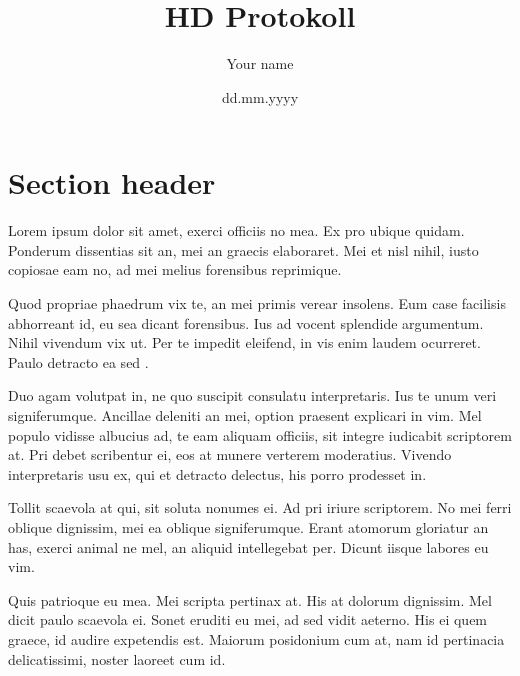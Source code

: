 \documentclass[%
 12pt,     %
 english,  %
 a4paper,  %
 DIV14,    %
 twoside,  %
 thesis,  %
 impberklaerung, %
]{hdprotokoll}
\title{HD Protokoll}
\author{Your name}
\date{dd.mm.yyyy}
\institute{free text}
\begin{document}
\maketitle
\cleardoublepage

\tableofcontents
               

\cleardoublepage 
{}


\section{Section header}
Lorem ipsum dolor sit amet, exerci officiis no mea. Ex pro ubique quidam. Ponderum dissentias sit an, mei an graecis elaboraret. Mei et nisl nihil, iusto copiosae eam no, ad mei melius forensibus reprimique.

Quod propriae phaedrum vix te, an mei primis verear insolens. Eum case facilisis abhorreant id, eu sea dicant forensibus. Ius ad vocent splendide argumentum. Nihil vivendum vix ut. Per te impedit eleifend, in vis enim laudem ocurreret. Paulo detracto ea sed \cite{hector1999plant}.

Duo agam volutpat in, ne quo suscipit consulatu interpretaris. Ius te unum veri signiferumque. Ancillae deleniti an mei, option praesent explicari in vim. Mel populo vidisse albucius ad, te eam aliquam officiis, sit integre iudicabit scriptorem at. Pri debet scribentur ei, eos at munere verterem moderatius. Vivendo interpretaris usu ex, qui et detracto delectus, his porro prodesset in.

Tollit scaevola at qui, sit soluta nonumes ei. Ad pri iriure scriptorem. No mei ferri oblique dignissim, mei ea oblique signiferumque. Erant atomorum gloriatur an has, exerci animal ne mel, an aliquid intellegebat per. Dicunt iisque labores eu vim.

Quis patrioque eu mea. Mei scripta pertinax at. His at dolorum dignissim. Mel dicit paulo scaevola ei. Sonet eruditi eu mei, ad sed vidit aeterno. His ei quem graece, id audire expetendis est. Maiorum posidonium cum at, nam id pertinacia delicatissimi, noster laoreet cum id.

\printbibliography
\end{document}
